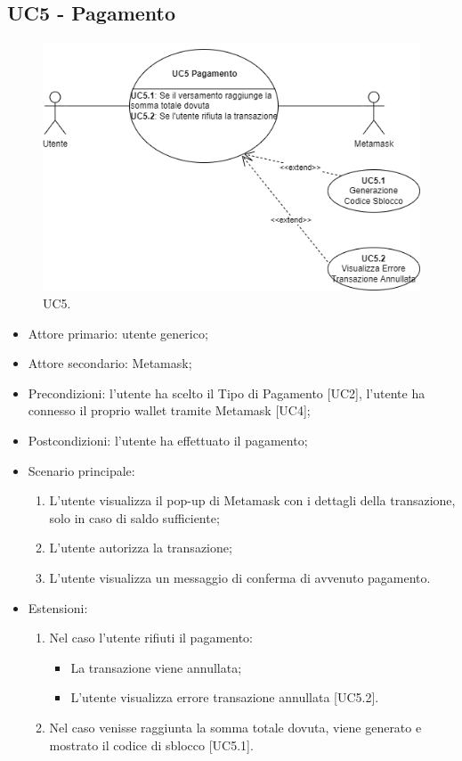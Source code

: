 \subsection{UC5 - Pagamento}

\begin{figure}[H]
    \centering
    \includegraphics[scale=0.7]{immagini/UseCases-UC5.png}
    \caption{UC5.}
\end{figure}

\begin{itemize}
    \item Attore primario: utente generico;
    \item Attore secondario: Metamask\glo{};
    \item Precondizioni: l'utente ha scelto il Tipo di Pagamento [UC2], l'utente ha connesso il proprio wallet\glo{} tramite Metamask\glo{} [UC4];
    \item Postcondizioni: l'utente ha effettuato il pagamento;
    \item Scenario principale:
          \begin{enumerate}
              \item L'utente visualizza il pop-up di Metamask\glo{} con i dettagli della transazione, solo in caso di saldo sufficiente;
              \item L'utente autorizza la transazione;
              \item L'utente visualizza un messaggio di conferma di avvenuto pagamento.
          \end{enumerate}
    \item Estensioni:
          \begin{enumerate}
              \item Nel caso l'utente rifiuti il pagamento:
                    \begin{itemize}
                        \item La transazione viene annullata;
                        \item L'utente visualizza errore transazione annullata [UC5.2].
                    \end{itemize}
              \item Nel caso venisse raggiunta la somma totale dovuta, viene generato e mostrato il codice di sblocco [UC5.1].
          \end{enumerate}
\end{itemize}

